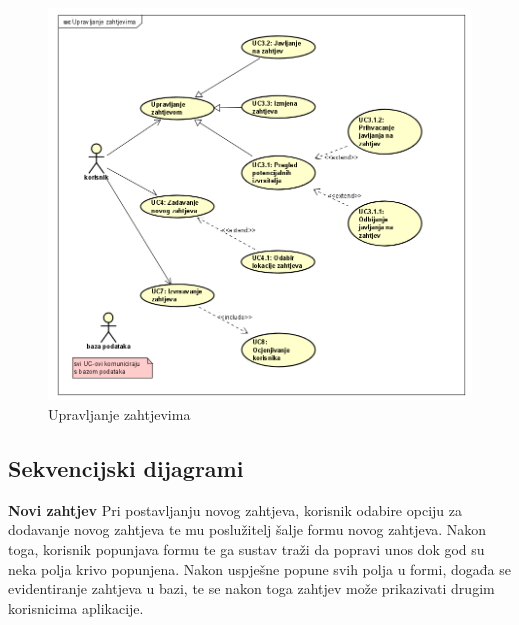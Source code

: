 				
					\begin{figure}[H]
					\includegraphics[scale=0.7]{slike/upravljanje-zahtjevima.png} %
					\centering
					\caption{Upravljanje zahtjevima}
				\end{figure}
				\newpage
				
				
				\eject		
				
			\subsection{Sekvencijski dijagrami}
				
				\noindent \large {\textbf{Novi zahtjev}}
				\newline
				\noindent \normalsize Pri postavljanju novog zahtjeva, korisnik odabire opciju za dodavanje novog zahtjeva te mu poslužitelj šalje formu novog zahtjeva. Nakon toga, korisnik popunjava formu te ga sustav traži da popravi unos dok god su neka polja krivo popunjena. Nakon uspješne popune svih polja u formi, događa se evidentiranje zahtjeva u bazi, te se nakon toga zahtjev može prikazivati drugim korisnicima aplikacije. 
				   
